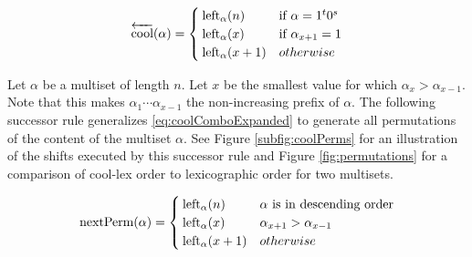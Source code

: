 \begin{equation} \label{eq:coolComboExpanded}
    \overleftarrow{\text{cool}}(\alpha) = \begin{cases}
	\leftshift[\alpha]{n} & \text{if $\alpha=1^t0^s$}\\
	\leftshift[\alpha]{x} & \text{if $\alpha_{x+1}=1$}\\
	\leftshift[\alpha]{x+1} & otherwise\\
\end{cases}
\end{equation}


 Let $\alpha$ be a multiset of length $n$.
 Let $x$ be the smallest value for which $\alpha_{x} > \alpha_{x-1}$.  Note that this makes $\alpha_{1}\cdots\alpha_{x-1}$ the non-increasing prefix of $\alpha$.  The following successor rule generalizes \eqref{eq:coolComboExpanded} to generate all permutations of the content of the multiset $\alpha$.  See Figure \ref{subfig:coolPerms} for an illustration of the shifts executed by this successor rule and Figure \ref{fig:permutations} for a comparison of cool-lex order to lexicographic order for two multisets.

\begin{equation}\label{eq:coolPerms}
    \text{nextPerm}(\alpha) = \begin{cases}
	\leftshift[\alpha]{n} & \text{$\alpha$ is in descending order}\\
	\leftshift[\alpha]{x} & \alpha_{x+1} > \alpha_{x-1}\\
	\leftshift[\alpha]{x+1} & otherwise\\
\end{cases}
\end{equation}





